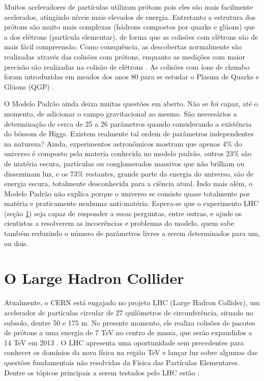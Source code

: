 Muitos aceleradores de partículas utilizam prótons pois eles são mais facilmente
acelerados, atingindo níveis mais elevados de energia. Entretanto a
estrutura dos prótons são muito mais complexas (hádrons
compostos por quarks e glúons) que a dos elétrons (partícula elementar), de forma que as colisões com elétrons são 
de mais fácil compreensão. Como consquência, as
descobertas normalmente são realizadas através das colisões com prótons, enquanto as medições com
maior precisão são realizadas na colisão de elétrons \cite{nature_space_and_time}.
As colisões com íons de chumbo foram introduzidas em meados dos anos 80
para se estudar o Plasma de Quarks e Glúons (QGP) \cite{heavy_ions}.

O Modelo Padrão ainda deixa muitas questões em aberto. Não se foi capaz, até o
momento, de adicionar o campo gravitacional ao mesmo. São necessários a
determinação de cerca de 25 a 26 parâmetros quando considerando a existência do
bóssom de Higgs. Existem realmente tal ordem de parâmetros independentes na
natureza? Ainda, experimentos astronômicos mostram que apenas 4\% do universo é
composto pela materia conhecida no modelo padrão, outros 23\% são de matéria
escura, partículas ou conglomerados massivos que não brilham ou disseminam luz,
e os 73\% restantes, grande parte da energia do universo, são de energia escura,
totalmente desconhecida para a ciência atual. Indo mais além, o Modelo Padrão
não explica porque o universo se consiste quase totalmente por matéria e
praticamente nenhuma anti-matéria. Espera-se que o experimento LHC (seção
\ref{sec:lhc}) seja capaz de responder a essas perguntas, entre outras, 
e ajude os cientistas a resolverem as incoerências e problemas do modelo, quem sabe também reduzindo 
o número de parâmetros livres a serem determinados para um, ou dois.
\cite{nature_space_and_time,Intro_Nuclear}

\section{O Large Hadron Collider}
\label{sec:lhc}

Atualmente, o CERN está engajado no projeto LHC (Large Hadron
Collider), um acelerador de partículas circular de 27 quilômetros de
circunferência, situado no subsolo, dentre 50 e 175 m. 
No presente momento, ele realiza colisões de pacotes de prótons a uma energia
de 7 TeV no centro de massa, que serão expandidos a 14 TeV em 2013 \cite{webATLAS}.
O LHC apresenta uma oportunidade sem precedentes para conhecer os domínios da
nova física na região TeV e lançar luz sobre algumas das questões fundamentais
não resolvidas da Física das Partículas Elementares. 
Dentre os tópicos principais a serem testados pelo LHC estão \cite{hunt_for_physics}:

